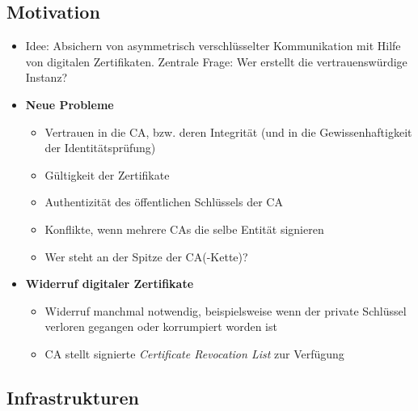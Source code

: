 \subsection{Motivation}
\begin{itemize}
	\item Idee: Absichern von asymmetrisch verschlüsselter Kommunikation mit Hilfe von digitalen Zertifikaten. Zentrale Frage: Wer erstellt die vertrauenswürdige Instanz?
	\item \textbf{Neue Probleme}
	\begin{itemize}
		\item Vertrauen in die CA, bzw. deren Integrität (und in die Gewissenhaftigkeit der Identitätsprüfung)
		\item Gültigkeit der Zertifikate
		\item Authentizität des öffentlichen Schlüssels der CA
		\item Konflikte, wenn mehrere CAs die selbe Entität signieren
		\item Wer steht an der Spitze der CA(-Kette)?
	\end{itemize}
	\item \textbf{Widerruf digitaler Zertifikate}
	\begin{itemize}
		\item Widerruf manchmal notwendig, beispielsweise wenn der private Schlüssel verloren gegangen oder korrumpiert worden ist
		\item CA stellt signierte \textit{Certificate Revocation List} zur Verfügung
	\end{itemize}
\end{itemize}


\subsection{Infrastrukturen}

